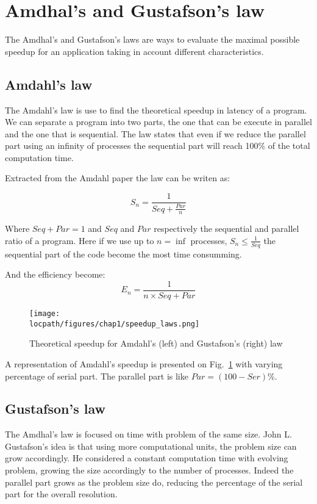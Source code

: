 \section{Amdhal's and Gustafson's law}
The Amdhal's and Gustafson's laws are ways to evaluate the maximal possible speedup for an application taking in account different characteristics. 

\subsection{Amdahl's law}
The Amdahl's law\cite{amdahl1967validity} is use to find the theoretical speedup in latency of a program.
We can separate a program into two parts, the one that can be execute in parallel and the one that is sequential. 
The law states that even if we reduce the parallel part using an infinity of processes the sequential part will reach 100\% of the total computation time. 

Extracted from the Amdahl paper the law can be writen as: 

\begin{equation}
S_n = \frac{1}{Seq + \frac{Par}{n}}
\end{equation}

Where $Seq + Par = 1$ and $Seq$ and $Par$ respectively the sequential and parallel ratio of a program.
Here if we use up to $n=\inf$ processes, $S_n \leq \frac{1}{Seq}$ the sequential part of the code become the most time consumming. 

And the efficiency become:
\begin{equation}
E_n = \frac{1}{n\times Seq + Par}
\end{equation}

\begin{figure}
\texttt{[image: \\locpath/figures/chap1/speedup\_laws.png]}
\caption{Theoretical speedup for Amdahl's (left) and Gustafson's (right) law}
\label{fig:1_HPC:speedup_laws}
\end{figure}

A representation of Amdahl's speedup is presented on Fig.~\ref{fig:1_HPC:speedup_laws} with varying percentage of serial part. 
The parallel part is like $Par = (100-Ser)\%$.

\subsection{Gustafson's law}
The Amdhal's law is focused on time with problem of the same size. 
John L. Gustafson's idea is that using more computational units, the problem size can grow accordingly. 
He considered a constant computation time with evolving problem, growing the size accordingly to the number of processes. 
Indeed the parallel part grows as the problem size do, reducing the percentage of the serial part for the overall resolution.

